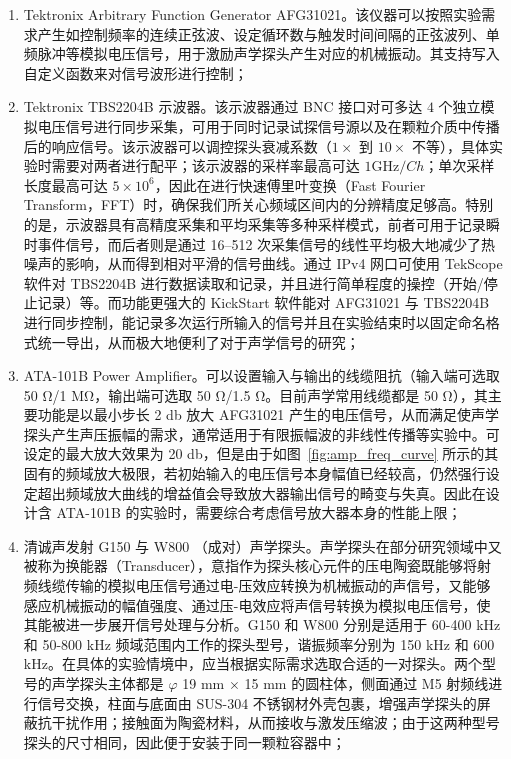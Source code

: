 \begin{enumerate}
  \item Tektronix Arbitrary Function Generator AFG31021。该仪器可以按照实验需求产生如控制频率的连续正弦波、设定循环数与触发时间间隔的正弦波列、单频脉冲等模拟电压信号，用于激励声学探头产生对应的机械振动。其支持写入自定义函数来对信号波形进行控制；
  \item Tektronix TBS2204B 示波器。该示波器通过 BNC 接口对可多达 $4$ 个独立模拟电压信号进行同步采集，可用于同时记录试探信号源以及在颗粒介质中传播后的响应信号。该示波器可以调控探头衰减系数（$1\times$ 到 $10\times$ 不等），具体实验时需要对两者进行配平；该示波器的采样率最高可达 $1\unit{\giga\hertz}/\unit{Ch}$；单次采样长度最高可达 $5\times 10^{6}$，因此在进行快速傅里叶变换（Fast Fourier Transform，FFT）时，确保我们所关心频域区间内的分辨精度足够高。特别的是，示波器具有高精度采集和平均采集等多种采样模式，前者可用于记录瞬时事件信号，而后者则是通过 \numrange{16}{512} 次采集信号的线性平均极大地减少了热噪声的影响，从而得到相对平滑的信号曲线。通过 IPv4 网口可使用 TekScope 软件对 TBS2204B 进行数据读取和记录，并且进行简单程度的操控（开始/停止记录）等。而功能更强大的 KickStart 软件能对 AFG31021 与 TBS2204B 进行同步控制，能记录多次运行所输入的信号并且在实验结束时以固定命名格式统一导出，从而极大地便利了对于声学信号的研究；
  \item ATA-101B Power Amplifier。可以设置输入与输出的线缆阻抗（输入端可选取 50 \unit{\ohm}/1 \unit{\mega\ohm}，输出端可选取 50 \unit{\ohm}/1.5 \unit{\ohm}。目前声学常用线缆都是 50 \unit{\ohm}），其主要功能是以最小步长 2 \unit{\decibel} 放大 AFG31021 产生的电压信号，从而满足使声学探头产生声压振幅的需求，通常适用于有限振幅波的非线性传播等实验中。可设定的最大放大效果为 20 \unit{\decibel}，但是由于如图~\ref{fig:amp_freq_curve} 所示的其固有的频域放大极限，若初始输入的电压信号本身幅值已经较高，仍然强行设定超出频域放大曲线的增益值会导致放大器输出信号的畸变与失真。因此在设计含 ATA-101B 的实验时，需要综合考虑信号放大器本身的性能上限；
  \item 清诚声发射 G150 与 W800 （成对）声学探头。声学探头在部分研究领域中又被称为换能器（Transducer），意指作为探头核心元件的压电陶瓷既能够将射频线缆传输的模拟电压信号通过电-压效应转换为机械振动的声信号，又能够感应机械振动的幅值强度、通过压-电效应将声信号转换为模拟电压信号，使其能被进一步展开信号处理与分析。G150 和 W800 分别是适用于 60-400 \unit{\kilo\Hz} 和 50-800 \unit{\kilo\hertz} 频域范围内工作的探头型号，谐振频率分别为 150 \unit{\kilo\hertz} 和 600 \unit{\kilo\hertz}。在具体的实验情境中，应当根据实际需求选取合适的一对探头。两个型号的声学探头主体都是 $\varphi$ 19 \unit{\milli\meter} $\times$ 15 \unit{\milli\meter} 的圆柱体，侧面通过 M5 射频线进行信号交换，柱面与底面由 SUS-304 不锈钢材外壳包裹，增强声学探头的屏蔽抗干扰作用；接触面为陶瓷材料，从而接收与激发压缩波；由于这两种型号探头的尺寸相同，因此便于安装于同一颗粒容器中；

\end{enumerate}
